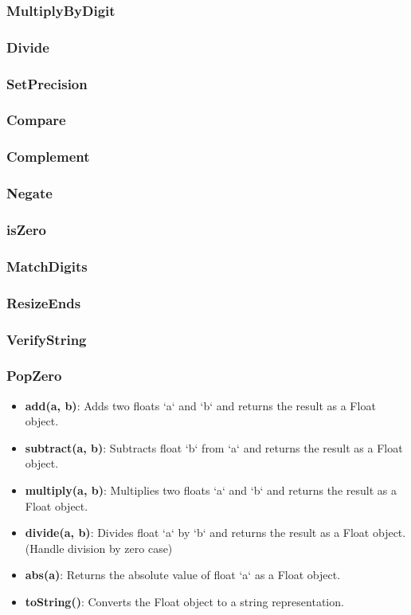 \subsubsection{MultiplyByDigit}
\subsubsection{Divide}
\subsubsection{SetPrecision}
\subsubsection{Compare}
\subsubsection{Complement}
\subsubsection{Negate}
\subsubsection{isZero}
\subsubsection{MatchDigits}
\subsubsection{ResizeEnds}
\subsubsection{VerifyString}
\subsubsection{PopZero}

\begin{itemize}
    \item \textbf{add(a, b)}: Adds two floats `a` and `b` and returns the result as a Float object.
    \item \textbf{subtract(a, b)}: Subtracts float `b` from `a` and returns the result as a Float object.
    \item \textbf{multiply(a, b)}: Multiplies two floats `a` and `b` and returns the result as a Float object.
    \item \textbf{divide(a, b)}: Divides float `a` by `b` and returns the result as a Float object. (Handle division by zero case)
    \item \textbf{abs(a)}: Returns the absolute value of float `a` as a Float object.
    \item \textbf{toString()}: Converts the Float object to a string representation.
\end{itemize}

